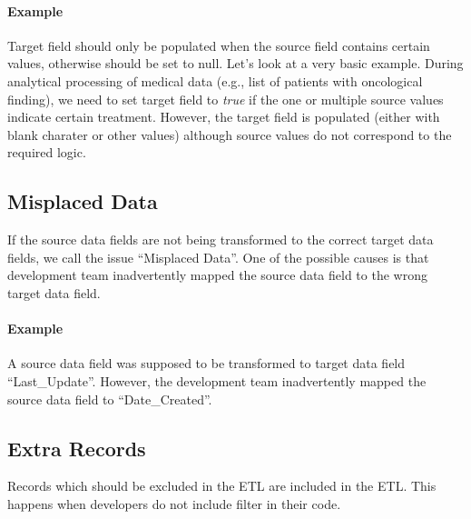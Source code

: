 \paragraph*{Example} Target field should only be populated when the source field contains certain values, otherwise should be set to null.
Let's look at a very basic example.
During analytical processing of medical data (e.g., list of patients with oncological finding), we need to set target field to \textit{true} if the one or multiple source values indicate certain treatment.
However, the target field is populated (either with blank charater or other values) although source values do not correspond to the required logic.


\subsection*{Misplaced Data}

If the source data fields are not being transformed to the correct target data fields, we call the issue \enquote{Misplaced Data}.
One of the possible causes is that development team inadvertently mapped the source data field to the wrong target data field.

\paragraph*{Example} A source data field was supposed to be transformed to target data field \enquote{Last\_Update}.
However, the development team inadvertently mapped the source data field to \enquote{Date\_Created}.


\subsection*{Extra Records}

Records which should be excluded in the ETL are included in the ETL.
This happens when developers do not include filter in their code.


